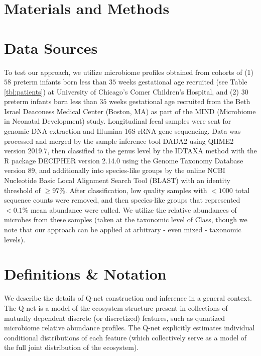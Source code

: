 \documentclass[onecolumn,10pt]{IEEEtran}
\def\qnet{Q-net\xspace}
\def\Methods{Materials and Methods}
\begin{document}
\section*{\Methods}

\section{Data Sources}
\label{sec:data_src_proc}



To test our approach, we utilize microbiome profiles obtained from cohorts of (1) $58$ preterm infants born less than $35$ weeks gestational age recruited \cite{oliphant2021bacteroidota} (see Table \ref{tbl:patients}) at University of Chicago's Comer Children's Hospital, and (2) $30$ preterm infants born less than $35$ weeks gestational age recruited from the Beth Israel Deaconess Medical Center (Boston, MA) as part of the MIND (Microbiome in Neonatal Development) study.  Longitudinal fecal samples were sent for genomic DNA extraction and Illumina 16S rRNA gene sequencing.\cite{walters2016improved,caporaso2012ultra} Data was processed and merged by the sample inference tool DADA2\cite{callahan2016dada2} using QIIME2 version 2019.7\cite{bolyen2019reproducible}, then classified to the genus level by the IDTAXA method\cite{murali2018idtaxa} with the R package DECIPHER version 2.14.0 using the Genome Taxonomy Database\cite{parks2018standardized} version 89, and additionally into species-like groups by the online NCBI Nucleotide Basic Local Alignment Search Tool\cite{altschul1990basic} (BLAST) with an identity threshold of $\geq 97$\%. After classification, low quality samples with $< 1000$ total sequence counts were removed, and then species-like groups that represented $< 0.1\%$ mean abundance were culled. We utilize the relative abundances of microbes from these samples (taken at the taxonomic level of Class, though we note that our approach can be applied at arbitrary - even mixed - taxonomic levels).  

\section{Definitions \& Notation}

We  describe the  details of \qnet construction and inference in a general context. The \qnet is a model of the ecosystem structure present in collections of mutually dependent discrete (or discretized) features, such as  quantized microbiome relative abundance profiles.  The \qnet explicitly estimates individual conditional distributions of each feature (which collectively serve as a model of the full joint distribution of the ecosystem). 
\end{document}
